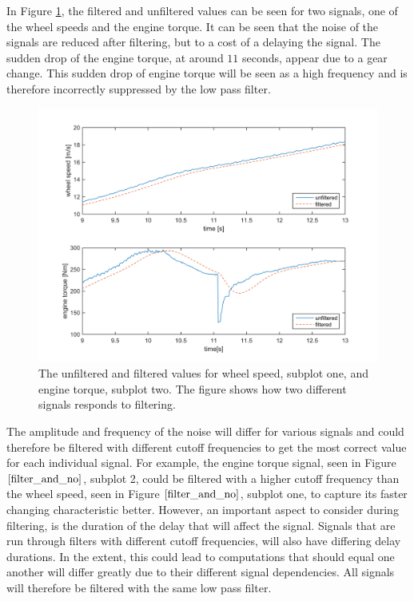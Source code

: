In Figure \ref{filter_and_no}, the filtered and unfiltered values can be seen for two signals, one of the wheel speeds and the engine torque. It can be seen that the noise of the signals are reduced after filtering, but to a cost of a delaying the signal. The sudden drop of the engine torque, at around $ 11 $ seconds, appear due to a gear change. This sudden drop of engine torque will be seen as a high frequency and is therefore incorrectly suppressed by the low pass filter.

\begin{figure}[h]
	\centering
	\includegraphics[width=1.0\textwidth]{Pictures/filter_and_no}
	\caption {The unfiltered and filtered values for wheel speed, subplot one, and engine torque, subplot two. The figure shows how two different signals responds to filtering.}
	\label{filter_and_no}
\end{figure}

The amplitude and frequency of the noise will differ for various signals and could therefore be filtered with different cutoff frequencies to get the most correct value for each individual signal. For example, the engine torque signal, seen in Figure $ \ref{filter_and_no} $, subplot 2, could be filtered with a higher cutoff frequency than the wheel speed, seen in Figure $ \ref{filter_and_no} $, subplot one, to capture its faster changing characteristic better. However, an important aspect to consider during filtering, is the duration of the delay that will affect the signal. Signals that are run through filters with different cutoff frequencies, will also have differing delay durations. In the extent, this could lead to computations that should equal one another will differ greatly due to their different signal dependencies. All signals will therefore be filtered with the same low pass filter. 


